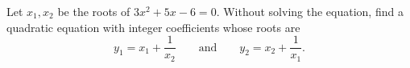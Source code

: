 Let $x_1,x_2$ be the roots of $3x^2+5x-6=0$. Without solving the equation, find a quadratic equation with integer coefficients whose roots are
\[
y_1=x_1+\dfrac{1}{x_2}\qquad\text{and}\qquad y_2=x_2+\dfrac{1}{x_1}.
\]
